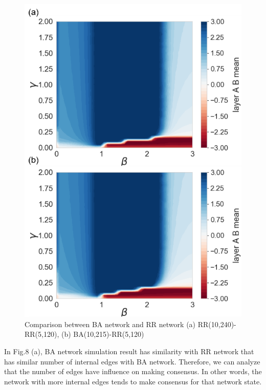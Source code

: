 \documentclass[english]{cccconf}
\begin{document}
\begin{figure}[!htb]
  \centering
  \includegraphics[width=\hsize]{FIG8.png}
  \caption{Comparison between BA network and RR network (a) RR(10,240)-RR(5,120), (b) BA(10,215)-RR(5,120)}
  \label{Fig8}
\end{figure}
In Fig.8 (a), BA network simulation result has similarity with RR network that has similar number of internal edges with BA network. Therefore, we can analyze that the number of edges have influence on making consensus. In other words, the network with more internal edges tends to make consensus for that network state.
\end{document}
